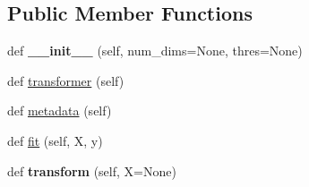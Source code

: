 \subsection*{Public Member Functions}
\begin{DoxyCompactItemize}
\item 
def {\bfseries \+\_\+\+\_\+init\+\_\+\+\_\+} (self, num\+\_\+dims=None, thres=None)\hypertarget{classdml_1_1lda_1_1LDA_a4e8e0793e2fdc34e9c3a2c8b2fd7dd15}{}\label{classdml_1_1lda_1_1LDA_a4e8e0793e2fdc34e9c3a2c8b2fd7dd15}

\item 
def \hyperlink{classdml_1_1lda_1_1LDA_a345bb18e92b9727b1835140cfb06bcf1}{transformer} (self)
\item 
def \hyperlink{classdml_1_1lda_1_1LDA_a34eac5a05ca665b60b01ecbbd7a97594}{metadata} (self)
\item 
def \hyperlink{classdml_1_1lda_1_1LDA_accd3f3321e39567e82f454228f592ab7}{fit} (self, X, y)
\item 
def {\bfseries transform} (self, X=None)\hypertarget{classdml_1_1lda_1_1LDA_a884b425003801e1978b5d56102b74ae6}{}\label{classdml_1_1lda_1_1LDA_a884b425003801e1978b5d56102b74ae6}

\end{DoxyCompactItemize}
